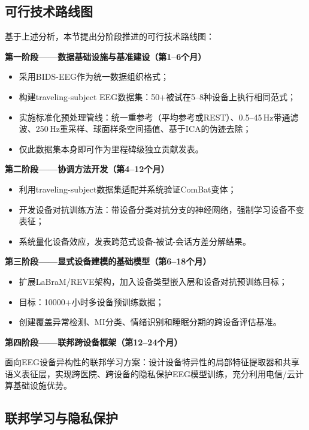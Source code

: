 \documentclass[12pt, a4paper]{article}
\begin{document}
\subsection{可行技术路线图}

基于上述分析，本节提出分阶段推进的可行技术路线图：

\textbf{第一阶段——数据基础设施与基准建设（第1--6个月）}

\begin{itemize}
  \item 采用BIDS-EEG\citep{Pernet2019BIDS}作为统一数据组织格式；
  \item 构建traveling-subject EEG数据集：50+被试在5--8种设备上执行相同范式；
  \item 实施标准化预处理管线：统一重参考（平均参考或REST）、0.5--45\,Hz带通滤波、250\,Hz重采样、球面样条空间插值、基于ICA的伪迹去除；
  \item 仅此数据集本身即可作为里程碑级独立贡献发表。
\end{itemize}

\textbf{第二阶段——协调方法开发（第4--12个月）}

\begin{itemize}
  \item 利用traveling-subject数据集适配并系统验证ComBat变体\citep{Jaramillo2024ComBat}；
  \item 开发设备对抗训练方法：带设备分类对抗分支的神经网络，强制学习设备不变表征；
  \item 系统量化设备效应，发表跨范式设备-被试-会话方差分解结果。
\end{itemize}

\textbf{第三阶段——显式设备建模的基础模型（第6--18个月）}

\begin{itemize}
  \item 扩展LaBraM/REVE架构，加入设备类型嵌入层和设备对抗预训练目标；
  \item 目标：10000+小时多设备预训练数据；
  \item 创建覆盖异常检测、MI分类、情绪识别和睡眠分期的跨设备评估基准。
\end{itemize}

\textbf{第四阶段——联邦跨设备框架（第12--24个月）}

面向EEG设备异构性的联邦学习\citep{Li2020federated}方案：设计设备特异性的局部特征提取器和共享语义表征层，实现跨医院、跨设备的隐私保护EEG模型训练，充分利用电信/云计算基础设施优势。

\subsection{联邦学习与隐私保护}
\end{document}
